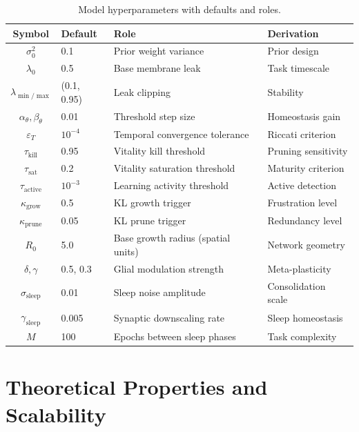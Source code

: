 \documentclass[12pt, a4paper]{article}
\begin{document}
\begin{table}[h]
\centering
\renewcommand{\arraystretch}{1.3}
\begin{tabular}{@{}clll@{}}
\toprule
\textbf{Symbol} & \textbf{Default} & \textbf{Role} & \textbf{Derivation} \\
\midrule
$\sigma^2_0$      & 0.1     & Prior weight variance & Prior design \\
$\lambda_0$       & 0.5     & Base membrane leak    & Task timescale \\
$\lambda_{\min/\max}$ & (0.1, 0.95) & Leak clipping & Stability \\
$\alpha_\theta, \beta_\theta$ & 0.01 & Threshold step size & Homeostasis gain \\
$\varepsilon_T$   & $10^{-4}$ & Temporal convergence tolerance & Riccati criterion \\
$\tau_{\text{kill}}$ & 0.95 & Vitality kill threshold & Pruning sensitivity \\
$\tau_{\text{sat}}$  & 0.2  & Vitality saturation threshold & Maturity criterion \\
$\tau_{\text{active}}$ & $10^{-3}$ & Learning activity threshold & Active detection \\
$\kappa_{\text{grow}}$ & 0.5 & KL growth trigger & Frustration level \\
$\kappa_{\text{prune}}$ & 0.05 & KL prune trigger & Redundancy level \\
$R_0$             & 5.0   & Base growth radius (spatial units) & Network geometry \\
$\delta, \gamma$  & 0.5, 0.3 & Glial modulation strength & Meta-plasticity \\
$\sigma_{\text{sleep}}$ & 0.01 & Sleep noise amplitude & Consolidation scale \\
$\gamma_{\text{sleep}}$ & 0.005 & Synaptic downscaling rate & Sleep homeostasis \\
$M$               & 100   & Epochs between sleep phases & Task complexity \\
\bottomrule
\end{tabular}
\caption{Model hyperparameters with defaults and roles.}
\label{tab:hyperparams}
\end{table}

\section{Theoretical Properties and Scalability}
\label{sec:theory}
\end{document}
